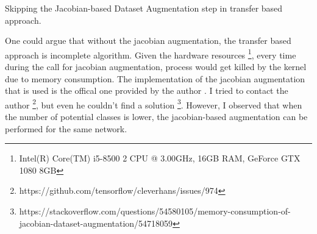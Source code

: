 Skipping the Jacobian-based Dataset Augmentation step in transfer based approach.

One could argue that without the jacobian augmentation, the transfer based approach is incomplete algorithm. Given the hardware resources \footnote{Intel(R) Core(TM) i5-8500 2 CPU @ 3.00GHz, 16GB RAM, GeForce GTX 1080 8GB}, every time during the call for jacobian augmentation, process would get killed by the kernel due to memory consumption. The implementation of the jacobian augmentation that is used is the offical one provided by the author \cite{papernot2018cleverhans}. I tried to contact the author \footnote{https://github.com/tensorflow/cleverhans/issues/974}, but even he couldn't find a solution \footnote{https://stackoverflow.com/questions/54580105/memory-consumption-of-jacobian-dataset-augmentation/54718059}. However, I observed that when the number of potential classes is lower, the jacobian-based augmentation can be performed for the same network.